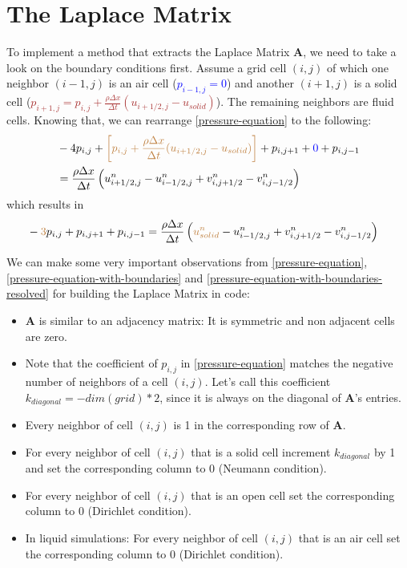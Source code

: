 \newpage

\section{ The Laplace Matrix }
To implement a method that extracts the Laplace Matrix \textbf{A}, we need to take a look on the boundary conditions first. Assume a grid cell $(i,j)$ of which one neighbor $(i-1,j)$ is an air cell (\textcolor{blue}{$p_{i-1,j}=0$}) and another $(i+1, j)$ is a solid cell (\textcolor{brown}{$p_{i+1,j}= p_{i,j} + \frac{\rho \Delta x}{\Delta t} (u_{i+1/2,j} - u_{solid})$}). The remaining neighbors are fluid cells. Knowing that, we can rearrange \ref{pressure-equation} to the following:
\begin{equation} \label{pressure-equation-with-boundaries}
    \begin{aligned}
        & -4p_{i,j} + \textcolor{brown}{\left[p_{i,j} + \frac{\rho \Delta x}{\Delta t} (u_{i+1/2,j} - u_{solid}) \right]} + p_{i,j+1} + \textcolor{blue}{0} + p_{i,j-1} \\
        & = \frac{\rho \Delta x}{\Delta t} \left( u_{i+1/2,j}^{n} - u_{i-1/2,j}^{n} + v_{i,j+1/2}^{n} - v_{i,j-1/2}^{n} \right)
    \end{aligned}
\end{equation}
which results in
\begin{equation} \label{pressure-equation-with-boundaries-resolved}
    \begin{aligned}
        & - \textcolor{brown}{3}p_{i,j} + p_{i,j+1} + p_{i,j-1} = \frac{\rho \Delta x}{\Delta t} \left( \textcolor{brown}{u_{solid}^{n}} - u_{i-1/2,j}^{n} + v_{i,j+1/2}^{n} - v_{i,j-1/2}^{n} \right)
    \end{aligned}
\end{equation}
\par We can make some very important observations from \ref{pressure-equation}, \ref{pressure-equation-with-boundaries} and \ref{pressure-equation-with-boundaries-resolved} for building the Laplace Matrix in code:
\begin{itemize}
      \item $\mathbf{A}$ is similar to an adjacency matrix: It is symmetric and non adjacent cells are zero.
      \item Note that the coefficient of $p_{i,j}$ in \ref{pressure-equation} matches the negative number of neighbors of a cell $(i,j)$. Let's call this coefficient $k_{diagonal} = -dim(grid) * 2$, since it is always on the diagonal of $\mathbf{A}$'s entries.
      \item Every neighbor of cell $(i,j)$ is 1 in the corresponding row of $\mathbf{A}$.
      \item For every neighbor of cell $(i,j)$ that is a solid cell increment $k_{diagonal}$ by 1 and set the corresponding column to 0 (Neumann condition).
      \item For every neighbor of cell $(i,j)$ that is an open cell set the corresponding column to 0 (Dirichlet condition).
      \item In liquid simulations: For every neighbor of cell $(i,j)$ that is an air cell set the corresponding column to 0 (Dirichlet condition).
\end{itemize}
